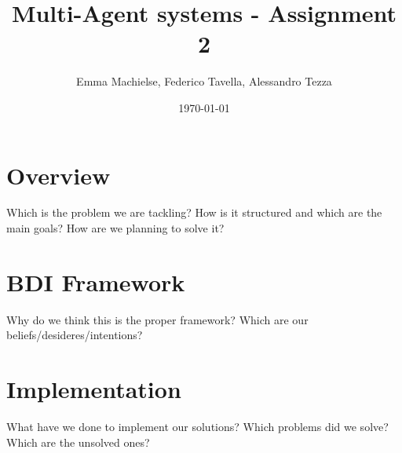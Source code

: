 \documentclass[a4paper]{article}
\title{Multi-Agent systems - Assignment 2}
\author{Emma Machielse, Federico Tavella, Alessandro Tezza}
\date{\today}
\begin{document}
\maketitle

\section{Overview}

Which is the problem we are tackling? How is it structured and which are the main goals? How are we planning to solve it?

\section{BDI Framework}

Why do we think this is the proper framework? Which are our beliefs/desideres/intentions?

\section{Implementation}

What have we done to implement our solutions? Which problems did we solve? Which are the unsolved ones?
\end{document}
